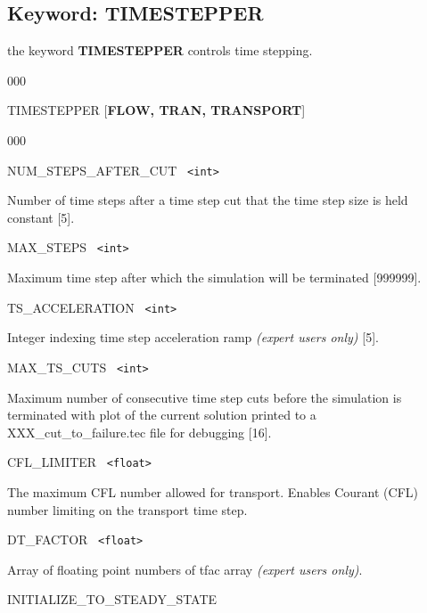 \hyperlink{target_key}{\return}


\newpage
\protect\hypertarget{target_timestep}{}

\subsection{Keyword: TIMESTEPPER}

\hfill\hyperlink{target_key}{\return}

 the keyword {\bf TIMESTEPPER} controls time stepping.

\hfill
\hyperlink{target_key}{\return}

\begin{deflist}{000}
\item[TIMESTEPPER] [{\bf FLOW, TRAN, TRANSPORT}]
\begin{deflist}{000}
\item[NUM\_STEPS\_AFTER\_CUT] \ {\tt <int>} 

Number of time steps after a time step cut that the time step size is held constant [5].

\item[MAX\_STEPS] \ {\tt <int>} 

Maximum time step after which the simulation will be terminated [999999].

\item[TS\_ACCELERATION] \ {\tt <int>} 

Integer indexing time step acceleration ramp {\em (expert users only)} [5].

\item[MAX\_TS\_CUTS] \ {\tt <int>} 

Maximum number of consecutive time step cuts before the simulation is terminated with plot of the current solution printed to a XXX\_cut\_to\_failure.tec file for debugging [16].

\item[CFL\_LIMITER] \ {\tt <float>}

The maximum CFL number allowed for transport. Enables Courant (CFL) number limiting on the transport time step.

\item[DT\_FACTOR] \ {\tt <float>} 

Array of floating point numbers of tfac array {\em (expert users only)}.

\item[INITIALIZE\_TO\_STEADY\_STATE] ~


\end{deflist}
\end{deflist}
